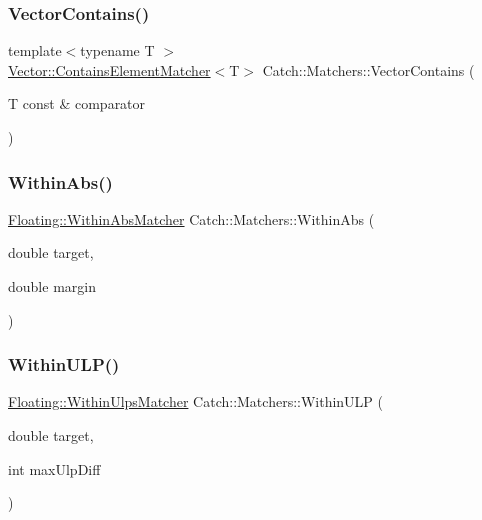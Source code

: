 \mbox{\label{namespace_catch_1_1_matchers_ae8db5846328116fb36386893deaec944}} 
\subsubsection{\texorpdfstring{Vector\+Contains()}{VectorContains()}}
{\footnotesize\ttfamily template$<$typename T $>$ \\
\mbox{\hyperlink{struct_catch_1_1_matchers_1_1_vector_1_1_contains_element_matcher}{Vector\+::\+Contains\+Element\+Matcher}}$<$T$>$ Catch\+::\+Matchers\+::\+Vector\+Contains (\begin{DoxyParamCaption}\item[{T const \&}]{comparator }\end{DoxyParamCaption})}

\mbox{\label{namespace_catch_1_1_matchers_a4c9ea76d47d02de0cf2d354c87c26e95}} 
\subsubsection{\texorpdfstring{Within\+Abs()}{WithinAbs()}}
{\footnotesize\ttfamily \mbox{\hyperlink{struct_catch_1_1_matchers_1_1_floating_1_1_within_abs_matcher}{Floating\+::\+Within\+Abs\+Matcher}} Catch\+::\+Matchers\+::\+Within\+Abs (\begin{DoxyParamCaption}\item[{double}]{target,  }\item[{double}]{margin }\end{DoxyParamCaption})}

\mbox{\label{namespace_catch_1_1_matchers_ae895591bd78a7d0ce4cdf3cf40d89ab5}} 
\subsubsection{\texorpdfstring{Within\+U\+L\+P()}{WithinULP()}\hspace{0.1cm}{\footnotesize\ttfamily [1/2]}}
{\footnotesize\ttfamily \mbox{\hyperlink{struct_catch_1_1_matchers_1_1_floating_1_1_within_ulps_matcher}{Floating\+::\+Within\+Ulps\+Matcher}} Catch\+::\+Matchers\+::\+Within\+U\+LP (\begin{DoxyParamCaption}\item[{double}]{target,  }\item[{int}]{max\+Ulp\+Diff }\end{DoxyParamCaption})}

